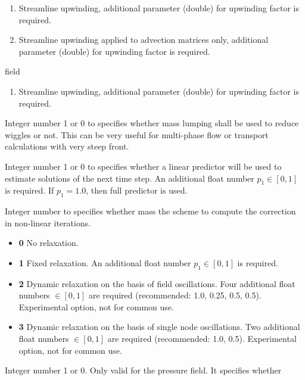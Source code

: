 \begin{description}
{\begin{description}
        {
          \begin{enumerate}
          \item Streamline upwinding, additional parameter (double) for upwinding factor is required.
          \item Streamline upwinding applied to advection matrices only,
               additional parameter (double) for upwinding  factor is required.
          \end{enumerate}
        }
        \item[saturation] field
        {
          \begin{enumerate}
          \item Streamline upwinding, additional parameter (double) for upwinding factor is required.
          \end{enumerate}
        }
      \end{description}
    }
    \item[\$MASS\_LUMPING] Integer number 1 or 0 to specifies whether mass lumping shall be used to reduce wiggles or not.
       This can be very useful for multi-phase flow  or transport calculations with very steep front.
    \item[\$PREDICTOR] Integer number 1 or 0 to specifies whether a linear predictor will be used to estimate solutions of
      the next time step. An additional float number $p_1\in [0,1]$ is required. If $p_1=1.0$, then full predictor is used.
    \item[\$RELAXATION] Integer number to specifies whether mass the scheme to compute the correction in non-linear iterations.
    {
      \begin{itemize}
       \item \textbf{0} No relaxation.
       \item \textbf{1} Fixed relaxation. An additional float number $p_1\in [0,1]$ is required.
       \item \textbf{2} Dynamic relaxation on the basis of field oscillations. Four additional float numbers $\in [0,1]$
       are required (recommended: 1.0, 0.25, 0.5, 0.5). Experimental option, not for common use.
       \item \textbf{3} Dynamic relaxation on the basis of single node oscillations. Two additional float numbers $\in [0,1]$
       are required (recommended: 1.0, 0.5). Experimental option, not for common use.
      \end{itemize}
     }
    \item[\$EXTRACT\_VALUES\_FROM\_PDE] Integer number 1 or 0. Only valid for the pressure field. It specifies whether

\end{description}
